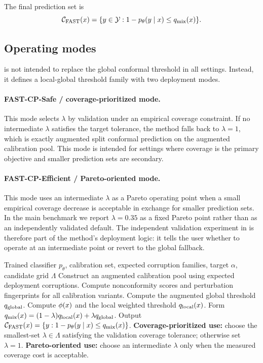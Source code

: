 The final prediction set is
\begin{equation}
    \mathcal{C}_{\mathrm{FAST}}(x)=\{y\in\mathcal{Y}: 1-p_\theta(y\mid x)\leq q_{\mathrm{mix}}(x)\}.
\end{equation}

\subsection{Operating modes}

\fastcp{} is not intended to replace the global conformal threshold in all settings. Instead, it defines a local-global threshold family with two deployment modes.

\paragraph{FAST-CP-Safe / coverage-prioritized mode.}
This mode selects $\lambda$ by validation under an empirical coverage constraint. If no intermediate $\lambda$ satisfies the target tolerance, the method falls back to $\lambda=1$, which is exactly augmented split conformal prediction on the augmented calibration pool. This mode is intended for settings where coverage is the primary objective and smaller prediction sets are secondary.

\paragraph{FAST-CP-Efficient / Pareto-oriented mode.}
This mode uses an intermediate $\lambda$ as a Pareto operating point when a small empirical coverage decrease is acceptable in exchange for smaller prediction sets. In the main benchmark we report $\lambda=0.35$ as a fixed Pareto point rather than as an independently validated default. The independent validation experiment in  is therefore part of the method's deployment logic: it tells the user whether to operate at an intermediate point or revert to the global fallback.

\begin{algorithm}[t]
\caption{\fastcp{} deployment protocol}
\label{alg:fastcp}
\begin{algorithmic}[1]
\Require Trained classifier $p_\theta$, calibration set, expected corruption families, target $\alpha$, candidate grid $\Lambda$
\State Construct an augmented calibration pool using expected deployment corruptions.
\State Compute nonconformity scores and perturbation fingerprints for all calibration variants.
\State Compute the augmented global threshold $q_{\mathrm{global}}$.
    \State Compute $\phi(x)$ and the local weighted threshold $q_{\mathrm{local}}(x)$.
    \State Form $q_{\mathrm{mix}}(x)=(1-\lambda)q_{\mathrm{local}}(x)+\lambda q_{\mathrm{global}}$.
    \State Output $\mathcal{C}_{\mathrm{FAST}}(x)=\{y:1-p_\theta(y\mid x)\leq q_{\mathrm{mix}}(x)\}$.
\EndFor
\Statex
\State \textbf{Coverage-prioritized use:} choose the smallest-set $\lambda\in\Lambda$ satisfying the validation coverage tolerance; otherwise set $\lambda=1$.
\State \textbf{Pareto-oriented use:} choose an intermediate $\lambda$ only when the measured coverage cost is acceptable.
\end{algorithmic}
\end{algorithm}


